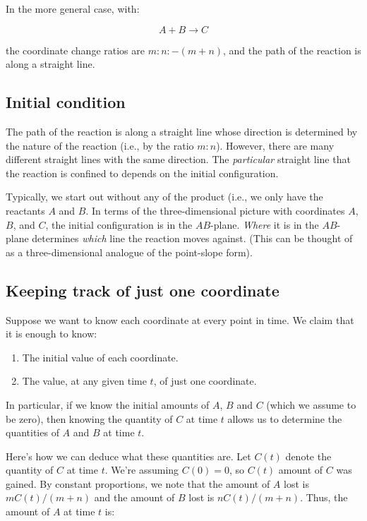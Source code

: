 \documentclass[10pt]{amsart}
\begin{document}
In the more general case, with:

$$A + B \to C$$

the coordinate change ratios are $m:n:-(m + n)$, and the path of the
reaction is along a straight line.

\subsection{Initial condition}

The path of the reaction is along a straight line whose direction is
determined by the nature of the reaction (i.e., by the ratio
$m:n$). However, there are many different straight lines with the same
direction. The {\em particular} straight line that the reaction is
confined to depends on the initial configuration.

Typically, we start out without any of the product (i.e., we only have
the reactants $A$ and $B$. In terms of the three-dimensional picture
with coordinates $A$, $B$, and $C$, the initial configuration is in
the $AB$-plane. {\em Where} it is in the $AB$-plane determines {\em
which} line the reaction moves against. (This can be thought of as a
three-dimensional analogue of the point-slope form).

\subsection{Keeping track of just one coordinate}

Suppose we want to know each coordinate at every point in time. We
claim that it is enough to know:

\begin{enumerate}
\item The initial value of each coordinate.
\item The value, at any given time $t$, of just one coordinate.
\end{enumerate}

In particular, if we know the initial amounts of $A$, $B$ and $C$
(which we assume to be zero), then knowing the quantity of $C$ at time
$t$ allows us to determine the quantities of $A$ and $B$ at time
$t$.

Here's how we can deduce what these quantities are. Let $C(t)$ denote
the quantity of $C$ at time $t$. We're assuming $C(0) = 0$, so $C(t)$
amount of $C$ was gained. By constant proportions, we note that the
amount of $A$ lost is $mC(t)/(m + n)$ and the amount of $B$ lost is
$nC(t)/(m + n)$. Thus, the amount of $A$ at time $t$ is:
\end{document}
